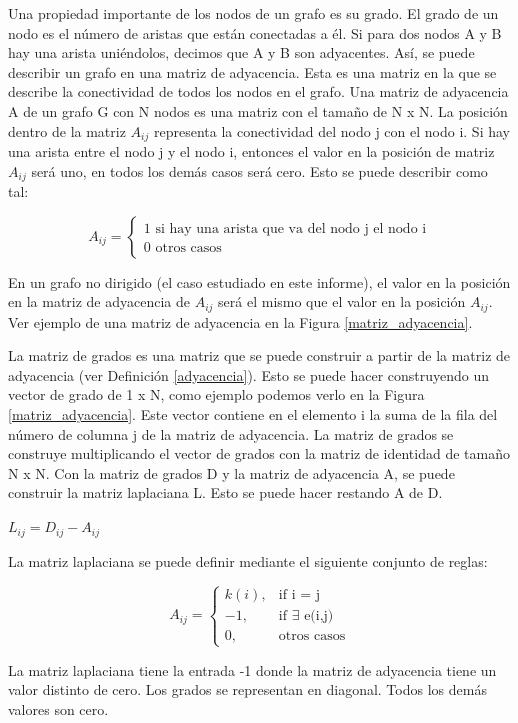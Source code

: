\begin{mydef}\label{adyacencia}
	Una propiedad importante de los nodos de un grafo es su grado. El grado de un nodo es el número de aristas que están conectadas a él. Si para dos nodos A y B hay una arista uniéndolos, decimos que A y B son adyacentes. Así, se puede describir un grafo en una matriz de adyacencia. Esta es una matriz en la que se describe la conectividad de todos los nodos en el grafo. Una matriz de adyacencia A de un grafo G con N nodos es una matriz con el tamaño de N x N. La posición dentro de la matriz $A_{ij}$ representa la conectividad del nodo j con el nodo i. Si hay una arista entre el nodo j y el nodo i, entonces el valor en la posición de matriz $A_{ij}$ será uno, en todos los demás casos será cero. 
	\newpage
	Esto se puede describir como tal:
	\begin{center}
		$$
		A_{ij} = 
		\begin{cases}
			\text{1 si hay una arista que va del nodo j el nodo i} \\
			\text{0 otros casos}
		\end{cases}
		$$
	\end{center}
	En un grafo no dirigido (el caso estudiado en este informe), el valor en la posición en la matriz de adyacencia de $A_{ij}$ será el mismo que el valor en la posición $A_{ij}$. Ver ejemplo de una matriz de adyacencia en la Figura \ref{matriz_adyacencia}.
\end{mydef}

\begin{mydef}\label{laplaciana}
	La matriz de grados es una matriz que se puede construir a partir de la matriz de adyacencia (ver Definición \ref{adyacencia}). Esto se puede hacer construyendo un vector de grado de 1 x N, como ejemplo podemos verlo en la Figura \ref{matriz_adyacencia}. Este vector contiene en el elemento i la suma de la fila del número de columna j de la matriz de adyacencia. La matriz de grados se construye multiplicando el vector de grados con la matriz de identidad de tamaño N x N. Con la matriz de grados D y la matriz de adyacencia A, se puede construir la matriz laplaciana L. Esto se puede hacer restando A de D.
	\begin{center}
		$L_{ij} = D_{ij} - A_{ij}$
	\end{center}
	La matriz laplaciana se puede definir mediante el siguiente conjunto de reglas:
	\begin{center}
		$$
		A_{ij} = 
		\begin{cases}
		k(i), & \text{if i = j} \\
		-1, & \text{if $\exists$ e(i,j)} \\
		0, & \text{otros casos}
		\end{cases}
		$$
	\end{center}
	La matriz laplaciana tiene la entrada -1 donde la matriz de adyacencia tiene un valor distinto de cero. Los grados se representan en diagonal. Todos los demás valores son cero.
\end{mydef}

